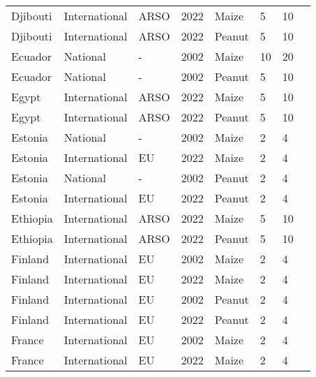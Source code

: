 \begin{landscape}
\begin{longtable}[c]{llllllll}
Djibouti          & International & ARSO     & 2022 & Maize  & 5  & 10 & \citet{ARSO2022}             \\
Djibouti          & International & ARSO     & 2022 & Peanut & 5  & 10 & \citet{ARSO2022}             \\
Ecuador           & National      & -        & 2002 & Maize  & 10 & 20 & \citet{van2004worldwide}     \\
Ecuador           & National      & -        & 2002 & Peanut & 5  & 10 & \citet{van2004worldwide}     \\
Egypt             & International & ARSO     & 2022 & Maize  & 5  & 10 & \citet{ARSO2022}             \\
Egypt             & International & ARSO     & 2022 & Peanut & 5  & 10 & \citet{ARSO2022}             \\
Estonia           & National      & -        & 2002 & Maize  & 2  & 4  & \citet{van2004worldwide}     \\
Estonia           & International & EU       & 2022 & Maize  & 2  & 4  & \citet{EC2010}               \\
Estonia           & National      & -        & 2002 & Peanut & 2  & 4  & \citet{van2004worldwide}     \\
Estonia           & International & EU       & 2022 & Peanut & 2  & 4  & \citet{EC2010}               \\
Ethiopia          & International & ARSO     & 2022 & Maize  & 5  & 10 & \citet{ARSO2022}             \\
Ethiopia          & International & ARSO     & 2022 & Peanut & 5  & 10 & \citet{ARSO2022}             \\
Finland           & International & EU       & 2002 & Maize  & 2  & 4  & \citet{EC2010}               \\
Finland           & International & EU       & 2022 & Maize  & 2  & 4  & \citet{EC2010}               \\
Finland           & International & EU       & 2002 & Peanut & 2  & 4  & \citet{EC2010}               \\
Finland           & International & EU       & 2022 & Peanut & 2  & 4  & \citet{EC2010}               \\
France            & International & EU       & 2002 & Maize  & 2  & 4  & \citet{EC2010}               \\
France            & International & EU       & 2022 & Maize  & 2  & 4  & \citet{EC2010}               \\

\end{longtable}
\end{landscape}
